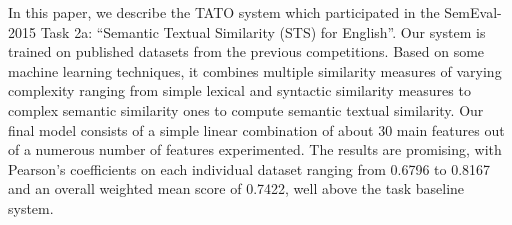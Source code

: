 In this paper, we describe the TATO system which participated in the SemEval-2015 Task 2a: ``Semantic Textual Similarity (STS) for English''. Our system is trained on published datasets from the previous competitions. Based on some machine learning techniques, it combines multiple similarity measures of varying complexity ranging from simple lexical and syntactic similarity measures to complex semantic similarity ones to compute semantic textual similarity. Our final model consists of a simple linear combination of about 30 main features out of a numerous number of features experimented. The results are promising, with Pearson's coefficients on each individual dataset ranging from 0.6796 to 0.8167 and an overall weighted mean score of 0.7422, well above the task baseline system.
